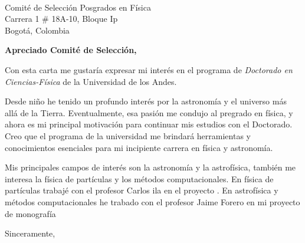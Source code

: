 \documentclass[10pt]{letter} %
\begin{document}

\begin{letter}{\\ Comité de Selección Posgrados en Física \\ Carrera 1 \# 18A-10, Bloque Ip \\ Bogotá, Colombia} %


\opening{\textbf{Apreciado Comité de Selección,}}
Con esta carta me gustaría expresar mi interés en el programa de \emph{Doctorado en Ciencias-Física} de la Universidad de los Andes.

Desde niño he tenido un profundo interés por la astronomía y el universo más allá de la Tierra. Eventualmente, esa pasión me condujo al pregrado en física, y ahora es mi principal motivación para continuar mis estudios con el Doctorado. Creo que el programa de la universidad me brindará herramientas y conocimientos esenciales para mi incipiente carrera en física y astronomía.

Mis principales campos de interés son la astronomía y la astrofísica, también me interesa la física de partículas y los métodos computacionales. En física de partículas trabajé con el profesor Carlos ila en el proyecto . En astrofísica y métodos computacionales he trabado con el profesor Jaime Forero en mi proyecto de monografía 



\vspace{2\parskip} %
\closing{Sinceramente,}
\vspace{2\parskip} %



\end{letter}
 
\end{document}
